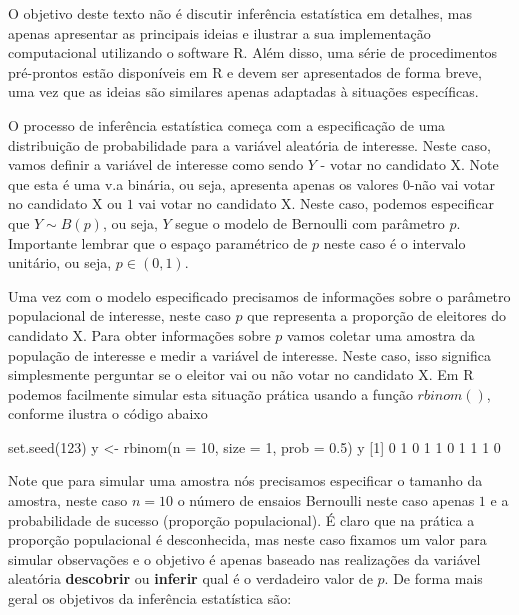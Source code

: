\documentclass[
  10pt,
  a4paper]{book}
\newenvironment{Shaded}{\begin{snugshade}}{\end{snugshade}}
\newcommand{\AttributeTok}[1]{\textcolor[rgb]{0.77,0.63,0.00}{#1}}
\newcommand{\DecValTok}[1]{\textcolor[rgb]{0.00,0.00,0.81}{#1}}
\newcommand{\FloatTok}[1]{\textcolor[rgb]{0.00,0.00,0.81}{#1}}
\newcommand{\FunctionTok}[1]{\textcolor[rgb]{0.00,0.00,0.00}{#1}}
\newcommand{\NormalTok}[1]{#1}
\newcommand{\OtherTok}[1]{\textcolor[rgb]{0.56,0.35,0.01}{#1}}
\begin{document}
O objetivo deste texto não é discutir inferência estatística em detalhes, mas apenas apresentar as principais ideias e ilustrar a sua implementação computacional utilizando o software R. Além disso, uma série de procedimentos pré-prontos estão disponíveis em R e devem ser apresentados de forma breve, uma vez que as ideias são similares apenas adaptadas à situações específicas.

O processo de inferência estatística começa com a especificação de uma distribuição de probabilidade para a variável aleatória de interesse. Neste caso, vamos definir a variável de interesse como sendo \(Y\) - votar no candidato X. Note que esta é uma v.a binária, ou seja, apresenta apenas os valores \(0\)-não vai votar no candidato X ou \(1\) vai votar no candidato X. Neste caso, podemos especificar que \(Y \sim B(p)\), ou seja, \(Y\) segue o modelo de Bernoulli com parâmetro \(p\). Importante lembrar que o espaço paramétrico de \(p\) neste caso é o intervalo unitário, ou seja, \(p \in (0,1)\).

Uma vez com o modelo especificado precisamos de informações sobre o parâmetro populacional de interesse, neste caso \(p\) que representa a proporção de eleitores do candidato X. Para obter informações sobre \(p\) vamos coletar uma amostra da população de interesse e medir a variável de interesse. Neste caso, isso significa simplesmente perguntar se o eleitor vai ou não votar no candidato X. Em R podemos facilmente simular esta situação prática usando a função \(rbinom()\), conforme ilustra o código abaixo

\begin{Shaded}
\begin{Highlighting}[]
\FunctionTok{set.seed}\NormalTok{(}\DecValTok{123}\NormalTok{)}
\NormalTok{y }\OtherTok{\textless{}{-}} \FunctionTok{rbinom}\NormalTok{(}\AttributeTok{n =} \DecValTok{10}\NormalTok{, }\AttributeTok{size =} \DecValTok{1}\NormalTok{, }\AttributeTok{prob =} \FloatTok{0.5}\NormalTok{)}
\NormalTok{y}
\NormalTok{ [}\DecValTok{1}\NormalTok{] }\DecValTok{0} \DecValTok{1} \DecValTok{0} \DecValTok{1} \DecValTok{1} \DecValTok{0} \DecValTok{1} \DecValTok{1} \DecValTok{1} \DecValTok{0}
\end{Highlighting}
\end{Shaded}

Note que para simular uma amostra nós precisamos especificar o tamanho da amostra, neste caso \(n=10\) o número de ensaios Bernoulli neste caso apenas \(1\) e a probabilidade de sucesso (proporção populacional). É claro que na prática a proporção populacional é desconhecida, mas neste caso fixamos um valor para simular observações e o objetivo é apenas baseado nas realizações da variável aleatória \textbf{descobrir} ou \textbf{inferir} qual é o verdadeiro valor de \(p\). De forma mais geral os objetivos da inferência estatística são:
\end{document}
